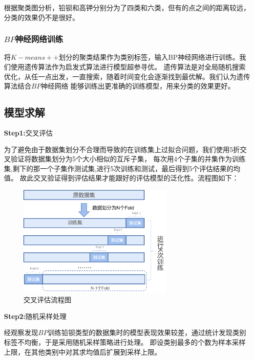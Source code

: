 \documentclass[UTF8]{ctexart}
\begin{document}
根据聚类图分析，铅钡和高钾分别分为了四类和六类，但有的点之间的距离较远，分类的效果仍不是很好。

\subsubsection{$BP$神经网络训练}

将$K-means++$划分的聚类结果作为类别标签，输入BP神经网络进行训练。我们使用遗传算法作为启发式算法进行模型超参寻优。
遗传算法是对全局随机搜索优化，从任一点出发，一直搜索，随着时间变化会逐渐找到最优解。我们认为遗传算法结合$BP$神经网络
能够训练出更准确的训练模型，用来分类的效果更好。

\subsection{模型求解}

\textbf{Step1:}交叉评估

为了避免由于数据集划分不合理而导致的在训练集上过拟合问题，我们使用5折交叉验证将数据集划分为5个大小相似的互斥子集，
每次用4个子集的并集作为训练集,剩下的那一个子集作测试集,进行5次训练和测试，最后得到5个评估结果的均值。
故此交叉验证得到评估结果才能跟好的评估模型的泛化性。流程图如下：

\begin{figure}[H]\centering
	\includegraphics[width=0.69\textwidth,height=0.6\textwidth]{img/交叉评估流程图.png} %
	\caption{交叉评估流程图} %
	\label{fig:figure 6} %
\end{figure}

\textbf{Step2:}随机采样处理

经观察发现$BP$训练铅钡类型的数据集时的模型表现效果较差，通过统计发现类别标签不均衡，于是采用随机采样策略进行处理。
即设类别最多的个数为样本采样上限，在其他类别中对其求均值后扩展到采样上限。
\end{document}

